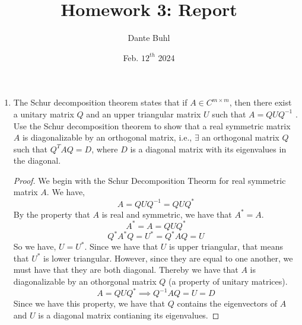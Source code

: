 \documentclass{article}
\title{Homework 3: Report}
\author{Dante Buhl}
\date{Feb. $12^{th}$ 2024}
\begin{document}
\newcommand{\bs}[1]{\boldsymbol{#1}}
\newcommand{\bmp}[1]{\begin{minipage}{#1\textwidth}}
\newcommand{\emp}{\end{minipage}}
\newcommand{\R}{\mathbb{R}}
\newcommand{\C}{\mathbb{C}}
\newcommand{\N}{\mathcal{N}}
\newcommand{\I}{\mathrm{I}}
\newcommand{\K}{\bs{\mathrm{K}}}
\newcommand{\m}{\bs{\mu}_*}
\newcommand{\s}{\bs{\Sigma}_*}
\newcommand{\dt}{\Delta t}
\newcommand{\tr}[1]{\text{Tr}(#1)}
\newcommand{\Tr}[1]{\text{Tr}(#1)}

\maketitle


\begin{enumerate}

\item %
The Schur decomposition theorem states that if $A \in C^{m\times m}$, then there
exist a unitary matrix $Q$ and an upper triangular matrix $U$ such that
$A = QUQ^{-1}$ . Use the Schur decomposition theorem to show that a real
symmetric matrix $A$ is diagonalizable by an orthogonal matrix, i.e., $\exists$ an
orthogonal matrix $Q$ such that $Q^T AQ = D$, where $D$ is a diagonal matrix
with its eigenvalues in the diagonal.

\begin{proof}

We begin with the Schur Decomposition Theorm for real symmetric matrix $A$. We have, 
\[
    A = QUQ^{-1} = QUQ^*
\]
By the property that $A$ is real and symmetric, we have that $A^* = A$.
\[
    A^* = A = QUQ^*
\]
\[
    Q^*A^*Q = U^* = Q^*AQ = U
\]
So we have, $U = U^*$. Since we have that $U$ is upper triangular, that means that $U^*$ is lower triangular. However, since they are equal to one another, we must have that they are both diagonal. Thereby we have that $A$ is diagonalizable by an othorgonal matrix $Q$ (a property of unitary matrices).
\[
    A = QUQ^* \implies Q^{-1}AQ = U = D
\]
Since we have this property, we have that $Q$ contains the eigenvectors of $A$ and $U$ is a diagonal matrix contianing its eigenvalues. 

\end{proof}



\end{enumerate}
\end{document}

